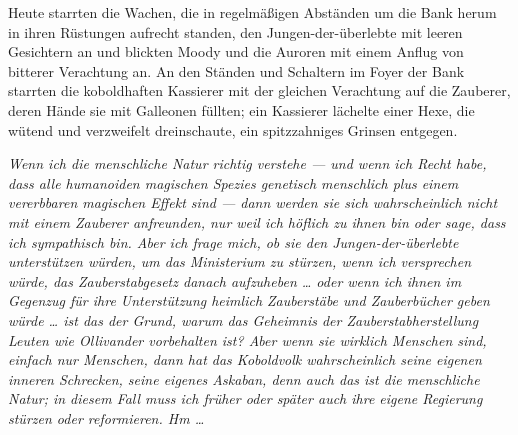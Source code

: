 Heute starrten die Wachen, die in regelmäßigen Abständen um die Bank herum in ihren Rüstungen aufrecht standen, den Jungen-der-überlebte mit leeren Gesichtern an und blickten Moody und die Auroren mit einem Anflug von bitterer Verachtung an. An den Ständen und Schaltern im Foyer der Bank starrten die koboldhaften Kassierer mit der gleichen Verachtung auf die Zauberer, deren Hände sie mit Galleonen füllten; ein Kassierer lächelte einer Hexe, die wütend und verzweifelt dreinschaute, ein spitzzahniges Grinsen entgegen.

\emph{Wenn ich die menschliche Natur richtig verstehe — und wenn ich Recht habe, dass alle humanoiden magischen Spezies genetisch menschlich plus einem vererbbaren magischen Effekt sind — dann werden sie sich wahrscheinlich nicht mit einem Zauberer anfreunden, nur weil ich höflich zu ihnen bin oder sage, dass ich sympathisch bin. Aber ich frage mich, ob sie den Jungen-der-überlebte unterstützen würden, um das Ministerium zu stürzen, wenn ich versprechen würde, das Zauberstabgesetz danach aufzuheben … oder wenn ich ihnen im Gegenzug für ihre Unterstützung heimlich Zauberstäbe und Zauberbücher geben würde … ist das der Grund, warum das Geheimnis der Zauberstabherstellung Leuten wie Ollivander vorbehalten ist? Aber wenn sie wirklich Menschen sind, einfach nur Menschen, dann hat das Koboldvolk wahrscheinlich seine eigenen inneren Schrecken, seine eigenes Askaban, denn auch das ist die menschliche Natur; in diesem Fall muss ich früher oder später auch ihre eigene Regierung stürzen oder reformieren. Hm …}

